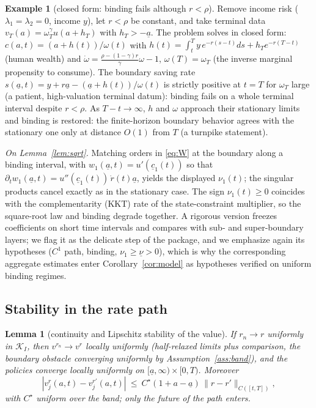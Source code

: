 \documentclass[11pt]{article}
\newtheorem{lemma}[theorem]{Lemma}
\theoremstyle{definition}
\newtheorem{example}[theorem]{Example}
\theoremstyle{remark}
\newcommand{\ubar}[1]{\underline{#1}}
\newcommand{\Kcal}{\mathcal{K}}
\newcommand{\ubc}{\ubar{c}}
\newcommand{\uba}{\ubar{a}}
\begin{document}
\begin{example}[closed form: binding fails although $r<\rho$]
\label{ex:closedform}
Remove income risk ($\lambda_1=\lambda_2=0$, income $y$), let
$r<\rho$ be constant, and take terminal data
$v_T(a)=\omega_T^{\gamma}u(a+h_T)$ with $h_T>-\uba$. The problem
solves in closed form: $c(a,t)=(a+h(t))/\omega(t)$ with
$h(t)=\int_t^Ty\,e^{-r(s-t)}ds+h_Te^{-r(T-t)}$ (human wealth) and
$\dot\omega=\frac{\rho-(1-\gamma)r}{\gamma}\omega-1$,
$\omega(T)=\omega_T$ (the inverse marginal propensity to consume).
The boundary saving rate $s(\uba,t)=y+r\uba-(\uba+h(t))/\omega(t)$
is strictly positive at $t=T$ for $\omega_T$ large (a patient,
high-valuation terminal datum): binding fails on a whole terminal
interval despite $r<\rho$. As $T-t\to\infty$, $h$ and $\omega$
approach their stationary limits and binding is restored: the
finite-horizon boundary behavior agrees with the stationary one only
at distance $O(1)$ from $T$ (a turnpike statement).
\end{example}

\emph{On Lemma~\ref{lem:sqrt}.} Matching orders in \eqref{eq:W} at
the boundary along a binding interval, with
$w_1(\uba,t)=u'(\ubc_1(t))$ so that
$\partial_tw_1(\uba,t)=u''(\ubc_1(t))\,\dot r(t)\uba$, yields the
displayed $\nu_1(t)$; the singular products cancel exactly as in the
stationary case. The sign $\nu_1(t)\ge0$ coincides with the
complementarity (KKT) rate of the state-constraint multiplier, so the
square-root law and binding degrade together. A rigorous version
freezes coefficients on short time intervals and compares with sub-
and super-boundary layers; we flag it as the delicate step of the
package, and we emphasize again its hypotheses ($C^1$ path, binding,
$\nu_1\ge\ubar\nu>0$), which is why the corresponding aggregate
estimates enter Corollary~\ref{cor:model} as hypotheses verified on
uniform binding regimes.

\subsection{Stability in the rate path}

\begin{lemma}[continuity and Lipschitz stability of the value]
\label{lem:stability}
If $r_n\to r$ uniformly in $\Kcal_I$, then $v^{r_n}\to v^r$ locally
uniformly (half-relaxed limits plus comparison, the boundary obstacle
converging uniformly by Assumption~\ref{ass:band}), and the policies
converge locally uniformly on $[\uba,\infty)\times[0,T)$. Moreover
\[
|v^r_j(a,t)-v^{r'}_j(a,t)|\ \le\
C^\star(1+a-\uba)\,\|r-r'\|_{C([t,T])},
\]
with $C^\star$ uniform over the band; only the future of the path
enters.
\end{lemma}
\end{document}
